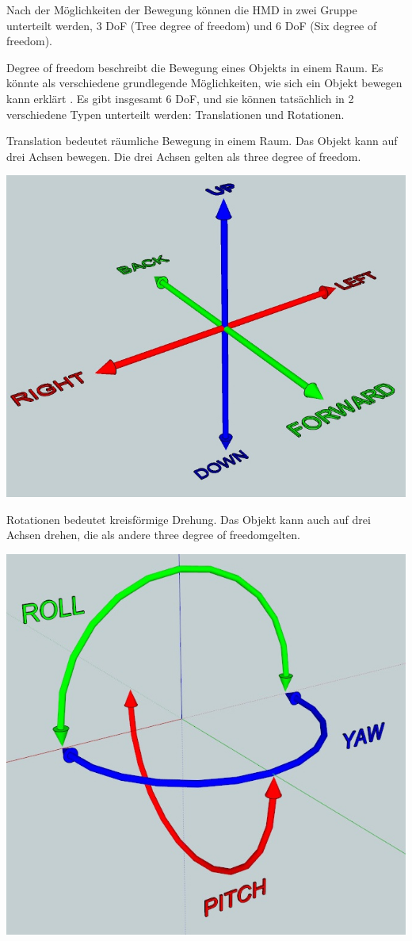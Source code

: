   Nach der Möglichkeiten der Bewegung können die HMD in zwei Gruppe unterteilt werden, 3 DoF (Tree degree of freedom) und 6 DoF (Six degree of freedom).
  
  Degree of freedom beschreibt die Bewegung eines Objekts in einem Raum. Es könnte als \glqq verschiedene grundlegende Möglichkeiten, wie sich ein Objekt bewegen kann \grqq erklärt \citep{25}. Es gibt insgesamt 6 DoF, und sie können tatsächlich in 2 verschiedene Typen unterteilt werden: Translationen und Rotationen.
  
  Translation bedeutet räumliche Bewegung in einem Raum. Das Objekt kann auf drei Achsen bewegen. Die drei Achsen gelten als \glqq three degree of freedom\grqq .
  
  \includegraphics[width=\textwidth]{images/translations-diagram.jpg}
  
  Rotationen bedeutet kreisförmige Drehung. Das Objekt kann auch auf drei Achsen drehen, die als andere \glqq three degree of freedom\grqq gelten.
  
  \includegraphics[width=\textwidth]{images/rotations-diagram.jpg}
  
